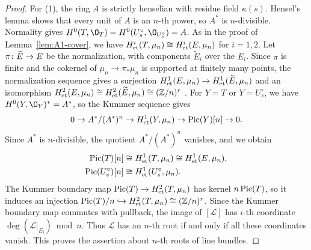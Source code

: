 \begin{proof}
For \textup{(1)}, the ring $A$ is strictly henselian with residue field $\kappa(s)$.
Hensel's lemma shows that every unit of $A$ is an $n$-th power, so $A^*$ is $n$-divisible.
Normality gives $H^0(T,\O_T) = H^0(U_s^\circ,\O_{U_s^\circ}) = A$.
As in the proof of Lemma~\ref{lem:A1-cover}, we have $H^i_{\rm et}(T,\mu_n)\cong H^i_{\rm et}(E,\mu_n)$ for $i = 1,2$.
Let $\pi\colon\widetilde E\to E$ be the normalization, with components $\widetilde E_i$ over the $E_i$.
Since $\pi$ is finite and the cokernel of $\mu_n\to\pi_*\mu_n$ is supported at finitely many points, the normalization sequence gives a surjection $H^1_{\rm et}(E,\mu_n)\to H^1_{\rm et}(\widetilde E,\mu_n)$ and an isomorphism $H^2_{\rm et}(E,\mu_n)\cong H^2_{\rm et}(\widetilde E,\mu_n)\cong(\mathbb{Z}/n)^r$ \cite[Tag~]{Stacks}.
For $Y = T$ or $Y = U_s^\circ$, we have $H^0(Y,\O_Y)^* = A^*$, so the Kummer sequence gives
\[
  0\to A^*/(A^*)^n\to H^1_{\rm et}(Y,\mu_n)\to\operatorname{Pic}(Y)[n]\to 0.
\]
Since $A^*$ is $n$-divisible, the quotient $A^*/(A^*)^n$ vanishes, and we obtain
\begin{equation}\label{eq:kummer-identifications}
  \begin{aligned}
    \operatorname{Pic}(T)[n] &\cong H^1_{\rm et}(T,\mu_n)\cong H^1_{\rm et}(E,\mu_n),\\
    \operatorname{Pic}(U_s^\circ)[n] &\cong H^1_{\rm et}(U_s^\circ,\mu_n).
  \end{aligned}
\end{equation}
The Kummer boundary map $\operatorname{Pic}(T)\to H^2_{\rm et}(T,\mu_n)$ has kernel $n\operatorname{Pic}(T)$, so it induces an injection $\operatorname{Pic}(T)/n\hookrightarrow H^2_{\rm et}(T,\mu_n)\cong(\mathbb{Z}/n)^r$.
Since the Kummer boundary map commutes with pullback, the image of $[\mathcal L]$ has $i$-th coordinate $\deg(\mathcal L|_{E_i})\bmod n$.
Thus $\mathcal L$ has an $n$-th root if and only if all these coordinates vanish.
This proves the assertion about $n$-th roots of line bundles.


\end{proof}
